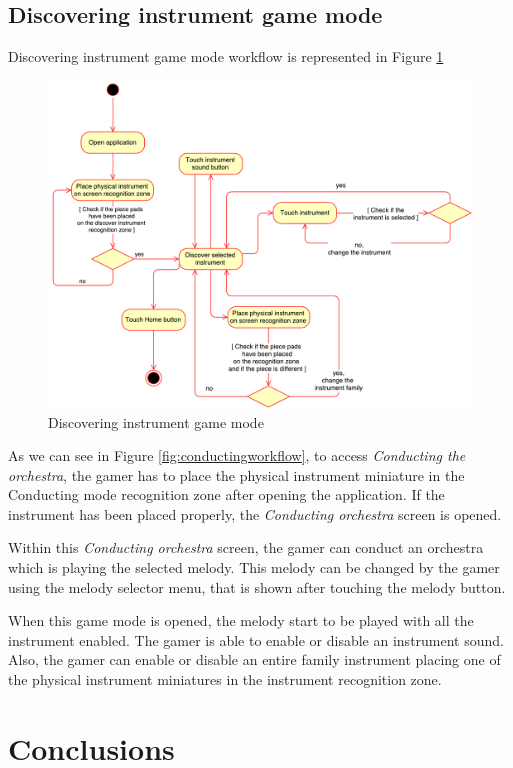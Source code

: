\FloatBarrier

\newpage
\subsection{Discovering instrument game mode}
\label{subsec:discoverinstrument_arch}

Discovering instrument game mode workflow is represented in Figure \ref{fig:discoveringworkflow}

\begin{figure}[ht!]
	\centering
	\includegraphics[width=400pt]{graphics/architecture/DiscoveringGameMode.pdf}
	\caption{Discovering instrument game mode}
	\label{fig:discoveringworkflow}
\end{figure}

As we can see in Figure \ref{fig:conductingworkflow}, to access \textit{Conducting the orchestra}, the gamer has to place the physical instrument miniature in the Conducting mode recognition zone after opening the application. If the instrument has been placed properly, the \textit{Conducting orchestra} screen is opened.

Within this \textit{Conducting orchestra} screen, the gamer can conduct an orchestra which is playing the selected melody. This melody can be changed by the gamer using the melody selector menu, that is shown after touching the melody button.

When this game mode is opened, the melody start to be played with all the instrument enabled. The gamer is able to enable or disable an instrument sound. Also, the gamer can enable or disable an entire family instrument placing one of the physical instrument miniatures in the instrument recognition zone.

\FloatBarrier

\section{Conclusions}
